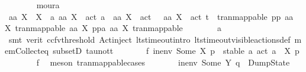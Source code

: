 \begin{isabellebody}
\ \ \ \ \ \ \isamarkupfalse%
\ moura\isanewline
\ \ \ \ \isamarkupfalse%
\ \isamarkupfalse%
\ {\isachardoublequoteopen}aa\ X\ {\isasymin}\ X\ {\isasymand}\ {\isacharparenleft}{\kern0pt}{\isasymforall}a{\isachardot}{\kern0pt}\ aa\ X\ {\isasymnoteq}\ act\ a{\isacharparenright}{\kern0pt}\ {\isasymlongrightarrow}\ aa\ X\ {\isasymnoteq}\ act\ {\isasymtau}\ {\isasymand}\ aa\ X\ {\isasymnoteq}\ act\ t\ {\isasymand}\ tran{\isacharunderscore}{\kern0pt}mappable\ {\isacharparenleft}{\kern0pt}pp\ {\isacharparenleft}{\kern0pt}aa\ X{\isacharparenright}{\kern0pt}\ tran{\isacharunderscore}{\kern0pt}mappable{\isacharparenright}{\kern0pt}\ {\isacharparenleft}{\kern0pt}aa\ X{\isacharparenright}{\kern0pt}\ {\isacharparenleft}{\kern0pt}ppa\ {\isacharparenleft}{\kern0pt}aa\ X{\isacharparenright}{\kern0pt}\ tran{\isacharunderscore}{\kern0pt}mappable{\isacharparenright}{\kern0pt}{\isachardoublequoteclose}\isanewline
\ \ \ \ \ \ \isamarkupfalse%
\ a{}\isanewline
\ \ \ \ \ \ \isamarkupfalse%
\ {\isacharparenleft}{\kern0pt}smt\ {\isacharparenleft}{\kern0pt}verit{\isacharcomma}{\kern0pt}\ ccfv{\isacharunderscore}{\kern0pt}threshold{\isacharparenright}{\kern0pt}\ Act{\isacharunderscore}{\kern0pt}{\isasymtheta}{\isachardot}{\kern0pt}inject{\isacharparenleft}{\kern0pt}{}{\isacharparenright}{\kern0pt}\ lts{\isacharunderscore}{\kern0pt}timeout{\isachardot}{\kern0pt}intro\ lts{\isacharunderscore}{\kern0pt}timeout{\isachardot}{\kern0pt}visible{\isacharunderscore}{\kern0pt}actions{\isacharunderscore}{\kern0pt}def\ mem{\isacharunderscore}{\kern0pt}Collect{\isacharunderscore}{\kern0pt}eq\ subsetD\ tau{\isacharunderscore}{\kern0pt}not{\isacharunderscore}{\kern0pt}t{\isacharparenright}{\kern0pt}\isanewline
\ \ \ \ \isamarkupfalse%
\ \isamarkupfalse%
\ f{}{\isacharcolon}{\kern0pt}\ {\isachardoublequoteopen}in{\isacharunderscore}{\kern0pt}env\ {\isacharparenleft}{\kern0pt}Some\ X{\isacharparenright}{\kern0pt}\ p\ {\isacharequal}{\kern0pt}\ stable\ {\isacharbraceleft}{\kern0pt}a{\isachardot}{\kern0pt}\ act\ a\ {\isasymin}\ X{\isacharbraceright}{\kern0pt}\ p{\isachardoublequoteclose}\isanewline
\ \ \ \ \ \ \isamarkupfalse%
\ f{}\ \isamarkupfalse%
\ {\isacharparenleft}{\kern0pt}meson\ tran{\isacharunderscore}{\kern0pt}mappable{\isachardot}{\kern0pt}cases{\isacharparenright}{\kern0pt}\isanewline
\ \ \ \ \isamarkupfalse%
\ \isamarkupfalse%
\ {\isachardoublequoteopen}in{\isacharunderscore}{\kern0pt}env\ {\isacharparenleft}{\kern0pt}Some\ Y{\isacharparenright}{\kern0pt}\ q\ {\isasymnoteq}\ DumpState{\isachardoublequoteclose}\isanewline

\end{isabellebody}
